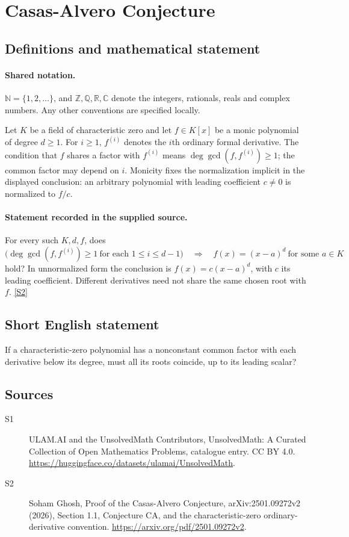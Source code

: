 \documentclass[11pt]{article}
\newcommand{\sref}[2]{\hyperlink{source:#1:#2}{[S#2]}}
\begin{document}
\section{Casas-Alvero Conjecture}\label{statement}

\subsection{Definitions and mathematical statement}

\paragraph{Shared notation.}$\mathbb N=\{1,2,\ldots\}$, and $\mathbb Z,\mathbb Q,\mathbb R,\mathbb C$ denote the integers, rationals, reals and complex numbers. Any other conventions are specified locally.


Let $K$ be a field of characteristic zero and let $f\in K[x]$ be a monic polynomial of degree $d\ge1$. For $i\ge1$, $f^{(i)}$ denotes the $i$th ordinary formal derivative. The condition that $f$ shares a factor with $f^{(i)}$ means $\deg\gcd(f,f^{(i)})\ge1$; the common factor may depend on $i$. Monicity fixes the normalization implicit in the displayed conclusion: an arbitrary polynomial with leading coefficient $c\ne0$ is normalized to $f/c$.
\paragraph{Statement recorded in the supplied source.}
For every such $K,d,f$, does
\[
 \bigl(\deg\gcd(f,f^{(i)})\ge1\ \text{for each }1\le i\le d-1\bigr)
 \quad\Longrightarrow\quad
 f(x)=(x-a)^d\ \text{for some }a\in K
\]
hold? In unnormalized form the conclusion is $f(x)=c(x-a)^d$, with $c$ its leading coefficient. Different derivatives need not share the same chosen root with $f$. \sref{statement}{2}
\subsection{Short English statement}
If a characteristic-zero polynomial has a nonconstant common factor with each derivative below its degree, must all its roots coincide, up to its leading scalar?
\subsection{Sources}
\begin{description}
\item[\hypertarget{source:statement:1}{S1}] ULAM.AI and the UnsolvedMath Contributors, UnsolvedMath: A Curated Collection of Open Mathematics Problems, catalogue entry. CC BY 4.0. \url{https://huggingface.co/datasets/ulamai/UnsolvedMath}.
\item[\hypertarget{source:statement:2}{S2}] Soham Ghosh, Proof of the Casas-Alvero Conjecture, arXiv:2501.09272v2 (2026), Section 1.1, Conjecture CA, and the characteristic-zero ordinary-derivative convention. \url{https://arxiv.org/pdf/2501.09272v2}.
\end{description}
\label{end:statement}
\end{document}
